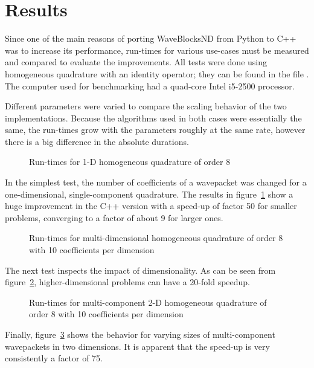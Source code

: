 \section{Results}
\label{sec:results}

Since one of the main reasons of porting WaveBlocksND from Python to C++ was to
increase its performance, run-times for various use-cases must be measured and
compared to evaluate the improvements.
All tests were done using homogeneous quadrature with an identity operator;
they can be found in the file .
The computer used for benchmarking had a quad-core Intel i5-2500 processor.

Different parameters were varied to compare the scaling behavior of the two
implementations.
Because the algorithms used in both cases were essentially the same, the
run-times grow with the parameters roughly at the same rate, however there is a
big difference in the absolute durations.

\begin{figure}
  \center
  
  \caption{Run-times for 1-D homogeneous quadrature of order 8}
  \label{fig:speedup1d}
\end{figure}

In the simplest test, the number of coefficients of a wavepacket was changed
for a one-dimensional, single-component quadrature.
The results in figure~\ref{fig:speedup1d} show a huge improvement in the C++
version with a speed-up of factor 50 for smaller problems, converging to a
factor of about 9 for larger ones.

\begin{figure}
  \center
  
  \caption{Run-times for multi-dimensional homogeneous quadrature of order 8
    with 10 coefficients per dimension}
  \label{fig:speedupnd}
\end{figure}

The next test inspects the impact of dimensionality.
As can be seen from figure~\ref{fig:speedupnd}, higher-dimensional problems can
have a 20-fold speedup.

\begin{figure}
  \center
  
  \caption{Run-times for multi-component 2-D homogeneous quadrature of order 8
    with 10 coefficients per dimension}
  \label{fig:speedupncomps}
\end{figure}

Finally, figure~\ref{fig:speedupncomps} shows the behavior for varying sizes
of multi-component wavepackets in two dimensions.
It is apparent that the speed-up is very consistently a factor of 75.

